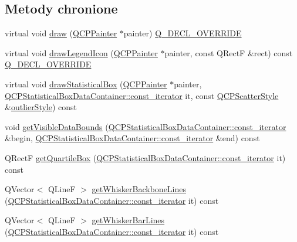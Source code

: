\subsection*{Metody chronione}
\begin{DoxyCompactItemize}
\item 
virtual void \hyperlink{class_q_c_p_statistical_box_afcff35fa79728cfe10e80e0702014fea}{draw} (\hyperlink{class_q_c_p_painter}{Q\+C\+P\+Painter} $\ast$painter) \hyperlink{qcustomplot_8hh_a42cc5eaeb25b85f8b52d2a4b94c56f55}{Q\+\_\+\+D\+E\+C\+L\+\_\+\+O\+V\+E\+R\+R\+I\+DE}
\item 
virtual void \hyperlink{class_q_c_p_statistical_box_ad286c63a79c21d5231a4b6c6fdbb914f}{draw\+Legend\+Icon} (\hyperlink{class_q_c_p_painter}{Q\+C\+P\+Painter} $\ast$painter, const Q\+RectF \&rect) const \hyperlink{qcustomplot_8hh_a42cc5eaeb25b85f8b52d2a4b94c56f55}{Q\+\_\+\+D\+E\+C\+L\+\_\+\+O\+V\+E\+R\+R\+I\+DE}
\item 
virtual void \hyperlink{class_q_c_p_statistical_box_a11077e9144b7bd22cc2a109ac6255b6e}{draw\+Statistical\+Box} (\hyperlink{class_q_c_p_painter}{Q\+C\+P\+Painter} $\ast$painter, \hyperlink{class_q_c_p_data_container_ae40a91f5cb0bcac61d727427449b7d15}{Q\+C\+P\+Statistical\+Box\+Data\+Container\+::const\+\_\+iterator} it, const \hyperlink{class_q_c_p_scatter_style}{Q\+C\+P\+Scatter\+Style} \&\hyperlink{class_q_c_p_statistical_box_ab7e5a68bce97ba43a7ff18e074c4dcad}{outlier\+Style}) const 
\item 
void \hyperlink{class_q_c_p_statistical_box_a13c6eaa963579b5a5c5f05c560e447ab}{get\+Visible\+Data\+Bounds} (\hyperlink{class_q_c_p_data_container_ae40a91f5cb0bcac61d727427449b7d15}{Q\+C\+P\+Statistical\+Box\+Data\+Container\+::const\+\_\+iterator} \&begin, \hyperlink{class_q_c_p_data_container_ae40a91f5cb0bcac61d727427449b7d15}{Q\+C\+P\+Statistical\+Box\+Data\+Container\+::const\+\_\+iterator} \&end) const 
\item 
Q\+RectF \hyperlink{class_q_c_p_statistical_box_af7fea1fd0b342ae6ecb228c5d4edd765}{get\+Quartile\+Box} (\hyperlink{class_q_c_p_data_container_ae40a91f5cb0bcac61d727427449b7d15}{Q\+C\+P\+Statistical\+Box\+Data\+Container\+::const\+\_\+iterator} it) const 
\item 
Q\+Vector$<$ Q\+LineF $>$ \hyperlink{class_q_c_p_statistical_box_ace6152baecc4376dafbc5192e3bab20f}{get\+Whisker\+Backbone\+Lines} (\hyperlink{class_q_c_p_data_container_ae40a91f5cb0bcac61d727427449b7d15}{Q\+C\+P\+Statistical\+Box\+Data\+Container\+::const\+\_\+iterator} it) const 
\item 
Q\+Vector$<$ Q\+LineF $>$ \hyperlink{class_q_c_p_statistical_box_a7d1d9d9cbffba6fa9c37d3051b9d80c7}{get\+Whisker\+Bar\+Lines} (\hyperlink{class_q_c_p_data_container_ae40a91f5cb0bcac61d727427449b7d15}{Q\+C\+P\+Statistical\+Box\+Data\+Container\+::const\+\_\+iterator} it) const 
\end{DoxyCompactItemize}

